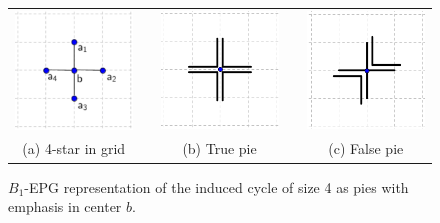 \begin{figure}[htb]
  \centering
  \begin{tabular}{c c c c c }
    \includegraphics[width=3.5cm]{./img/disposicaoTortaGrid3}    
    & &\includegraphics[width=3.5cm]{./img/truePieGrid} 
    & &
 \includegraphics[width=3.5cm]{./img/falsePieGrid} \\%
    {\footnotesize (a) 4-star in grid}  & &  {\footnotesize (b) True pie} & & {\footnotesize (c) False pie} %
  \end{tabular}
  \caption{$B_{1}$-EPG representation of the induced cycle of size 4 as pies with emphasis in center $b$.}\label{fig:piesInGrid2}
\end{figure} 
